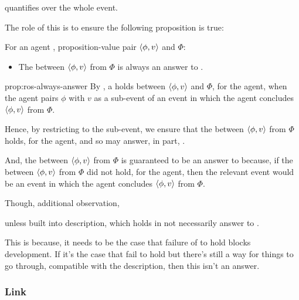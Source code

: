 \begin{note}
  \qWhyV{} quantifies over the whole event.

  The role of this is to ensure the following proposition is true:

  \begin{proposition}
    \label{prop:ros-always-answer}
    For an agent \vAgent{}, proposition-value pair \(\langle \phi, v \rangle\) and \poP{} \(\Phi\):

    \begin{itemize}
    \item
      The \ros{} between \(\langle \phi, v \rangle\) from \(\Phi\) is always an answer to \qWhyV{}.
    \end{itemize}
    \vspace{-\baselineskip}
  \end{proposition}

  \begin{argument}{prop:ros-always-answer}
    By \supportI{}, a \ros{} holds between \(\langle \phi, v \rangle\) and \(\Phi\), for the agent, when the agent pairs \(\phi\) with \(v\) as a sub-event of an event in which the agent concludes \(\langle \phi, v \rangle\) from \(\Phi\).

    Hence, by restricting \qWhyV{} to the sub-event, we ensure that the \ros{} between \(\langle \phi, v \rangle\) from \(\Phi\) holds, for the agent, and so may answer, in part, \qWhyV{}.

    And, the \ros{} between \(\langle \phi, v \rangle\) from \(\Phi\) is guaranteed to be an answer to \qWhyV{} because, if the \ros{} between \(\langle \phi, v \rangle\) from \(\Phi\) did not hold, for the agent, then the relevant event would be an event in which the agent concludes \(\langle \phi, v \rangle\) from \(\Phi\).
  \end{argument}

  Though, additional observation,

  \begin{observation}
    unless built into description, \ros{} which holds in not necessarily answer to \qWhyV{}.

    This is because, it needs to be the case that failure of \ros{} to hold blocks development.
    If it's the case that fail to hold but there's still a way for things to go through, compatible with the description, then this \ros{} isn't an answer.
  \end{observation}
\end{note}

\subsubsection{Link}
\label{cha:var:sec:vars:qwhyvnp:link}

